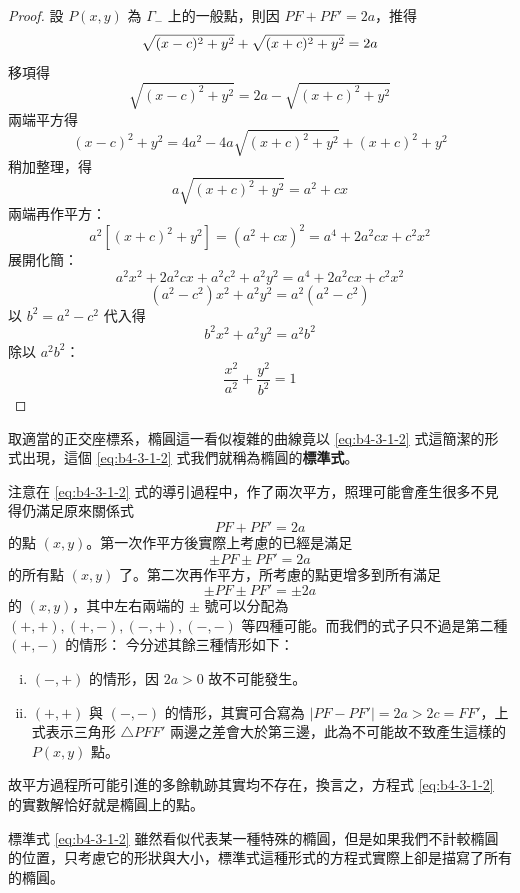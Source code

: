 \begin{proof}
設 $P(x,y)$ 為 $\Gamma_-$ 上的一般點，則因 $PF + PF' = 2a$，推得
\begin{equation}
\sqrt{(x-c)^2 + y^2} + \sqrt{(x+c)^2 + y^2} = 2a \notag
\end{equation}
移項得
\[ \sqrt{(x-c)^2 + y^2} = 2a - \sqrt{(x+c)^2 + y^2} \]
兩端平方得
\[ (x-c)^2 + y^2 = 4a^2 - 4a\sqrt{(x+c)^2 + y^2} + (x+c)^2 + y^2 \]
稍加整理，得
\begin{equation}
a\sqrt{(x+c)^2 + y^2} = a^2 + cx \label{eq:b4-3-1-3}
\end{equation}
兩端再作平方：
\[ a^2[(x+c)^2 + y^2] = (a^2 + cx)^2 = a^4 + 2a^2cx + c^2x^2 \]
展開化簡：
\[ a^2x^2 + 2a^2cx + a^2c^2 + a^2y^2 = a^4 + 2a^2cx + c^2x^2 \]
\begin{equation}
(a^2 - c^2)x^2 + a^2y^2 = a^2(a^2 - c^2) \label{eq:b4-3-1-4}
\end{equation}
以 $b^2 = a^2 - c^2$ 代入得
\[ b^2x^2 + a^2y^2 = a^2b^2 \]
除以 $a^2b^2$：
\[ \frac{x^2}{a^2} + \frac{y^2}{b^2} = 1 \]
\end{proof}

取適當的正交座標系，橢圓這一看似複雜的曲線竟以 \eqref{eq:b4-3-1-2} 式這簡潔的形式出現，這個 \eqref{eq:b4-3-1-2} 式我們就稱為橢圓的\textbf{標準式}。

注意在 \eqref{eq:b4-3-1-2} 式的導引過程中，作了兩次平方，照理可能會產生很多不見得仍滿足原來關係式
\[ PF + PF' = 2a \]
的點 $(x,y)$。第一次作平方後實際上考慮的已經是滿足
\[ \pm PF \pm PF' = 2a \]
的所有點 $(x,y)$ 了。第二次再作平方，所考慮的點更增多到所有滿足
\[ \pm PF \pm PF' = \pm 2a \]
的 $(x,y)$，其中左右兩端的 $\pm$ 號可以分配為 $(+,+), (+,-), (-,+), (-,-)$ 等四種可能。而我們的式子只不過是第二種 $(+,-)$ 的情形：
今分述其餘三種情形如下：
\begin{enumerate}[(i)]
  \item $(-,+)$ 的情形，因 $2a > 0$ 故不可能發生。
  \item $(+,+)$ 與 $(-,-)$ 的情形，其實可合寫為 $|PF - PF'| = 2a > 2c = FF'$，上式表示三角形 $\triangle PFF'$ 兩邊之差會大於第三邊，此為不可能故不致產生這樣的 $P(x,y)$ 點。
\end{enumerate}
故平方過程所可能引進的多餘軌跡其實均不存在，換言之，方程式 \eqref{eq:b4-3-1-2} 的實數解恰好就是橢圓上的點。

標準式 \eqref{eq:b4-3-1-2} 雖然看似代表某一種特殊的橢圓，但是如果我們不計較橢圓的位置，只考慮它的形狀與大小，標準式這種形式的方程式實際上卻是描寫了所有的橢圓。

